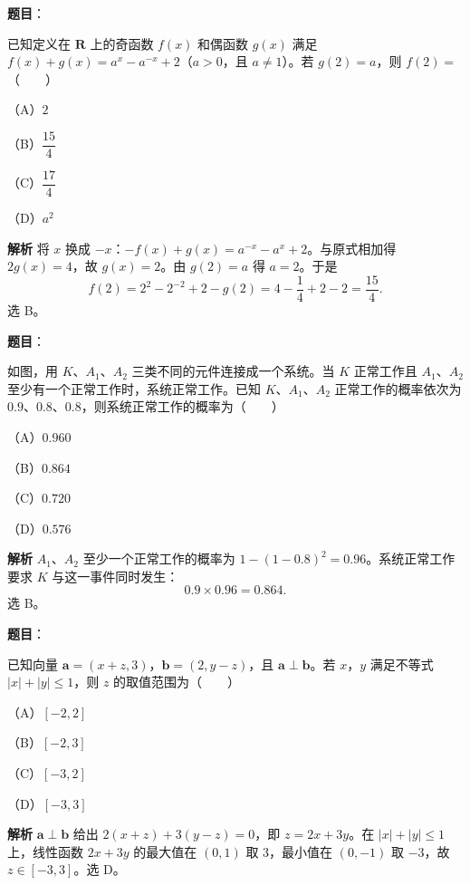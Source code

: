 \begin{answer}

\textbf{题目}：

已知定义在 $\mathbf R$ 上的奇函数 $f(x)$ 和偶函数 $g(x)$ 满足 $f(x)+g(x)=a^x-a^{-x}+2$（$a>0$，且 $a\neq1$）。若 $g(2)=a$，则 $f(2)=$\mbox{（　　）}

（A）$2$

（B）$\dfrac{15}4$

（C）$\dfrac{17}4$

（D）$a^2$

\textbf{解析}
将 $x$ 换成 $-x$：$-f(x)+g(x)=a^{-x}-a^x+2$。与原式相加得 $2g(x)=4$，故 $g(x)=2$。由 $g(2)=a$ 得 $a=2$。于是
\nopagebreak[4]
\[f(2)=2^2-2^{-2}+2-g(2)=4-\frac14+2-2=\frac{15}4.\]
选 B。


\end{answer}
\begin{answer}

\textbf{题目}：

如图，用 $K$、$A_1$、$A_2$ 三类不同的元件连接成一个系统。当 $K$ 正常工作且 $A_1$、$A_2$ 至少有一个正常工作时，系统正常工作。已知 $K$、$A_1$、$A_2$ 正常工作的概率依次为 $0.9$、$0.8$、$0.8$，则系统正常工作的概率为\mbox{（　　）}

（A）$0.960$

（B）$0.864$

（C）$0.720$

（D）$0.576$
\nopagebreak[4]
\begin{center}\end{center}
\nopagebreak[4]
\textbf{解析}
$A_1$、$A_2$ 至少一个正常工作的概率为 $1-(1-0.8)^2=0.96$。系统正常工作要求 $K$ 与这一事件同时发生：
\nopagebreak[4]
\[0.9\times0.96=0.864.\]
选 B。


\end{answer}
\begin{answer}

\textbf{题目}：

已知向量 $\boldsymbol a=(x+z,3)$，$\boldsymbol b=(2,y-z)$，且 $\boldsymbol a\perp\boldsymbol b$。若 $x$，$y$ 满足不等式 $|x|+|y|\leqslant1$，则 $z$ 的取值范围为\mbox{（　　）}

（A）$[-2,2]$

（B）$[-2,3]$

（C）$[-3,2]$

（D）$[-3,3]$

\textbf{解析}
$\boldsymbol a\perp\boldsymbol b$ 给出 $2(x+z)+3(y-z)=0$，即 $z=2x+3y$。在 $|x|+|y|\leqslant1$ 上，线性函数 $2x+3y$ 的最大值在 $(0,1)$ 取 $3$，最小值在 $(0,-1)$ 取 $-3$，故 $z\in[-3,3]$。选 D。


\end{answer}
